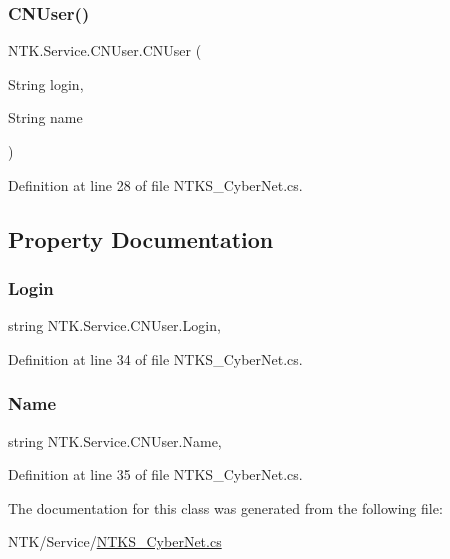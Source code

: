\subsubsection{\texorpdfstring{CNUser()}{CNUser()}}
{\footnotesize\ttfamily N\+T\+K.\+Service.\+C\+N\+User.\+C\+N\+User (\begin{DoxyParamCaption}\item[{String}]{login,  }\item[{String}]{name }\end{DoxyParamCaption})}



Definition at line 28 of file N\+T\+K\+S\+\_\+\+Cyber\+Net.\+cs.



\subsection{Property Documentation}
\mbox{\label{class_n_t_k_1_1_service_1_1_c_n_user_a760f6785eec52a7d11d52e88e62bde14}} 
\subsubsection{\texorpdfstring{Login}{Login}}
{\footnotesize\ttfamily string N\+T\+K.\+Service.\+C\+N\+User.\+Login\hspace{0.3cm}{\ttfamily [get]}, {\ttfamily [set]}}



Definition at line 34 of file N\+T\+K\+S\+\_\+\+Cyber\+Net.\+cs.

\mbox{\label{class_n_t_k_1_1_service_1_1_c_n_user_a27ac1c6fc205a74d38937ed74744fd5d}} 
\subsubsection{\texorpdfstring{Name}{Name}}
{\footnotesize\ttfamily string N\+T\+K.\+Service.\+C\+N\+User.\+Name\hspace{0.3cm}{\ttfamily [get]}, {\ttfamily [set]}}



Definition at line 35 of file N\+T\+K\+S\+\_\+\+Cyber\+Net.\+cs.



The documentation for this class was generated from the following file\+:\begin{DoxyCompactItemize}
\item 
N\+T\+K/\+Service/\mbox{\hyperlink{_n_t_k_s___cyber_net_8cs}{N\+T\+K\+S\+\_\+\+Cyber\+Net.\+cs}}\end{DoxyCompactItemize}
